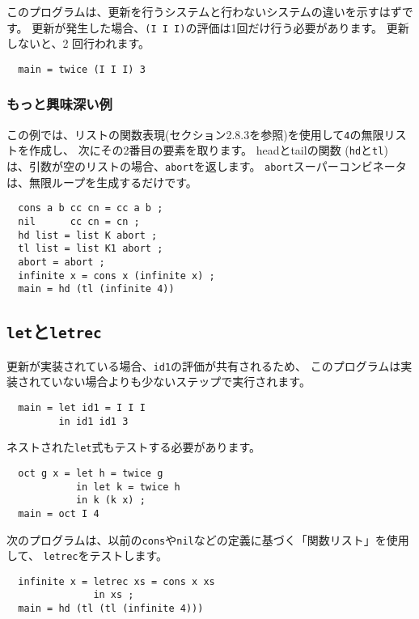 \documentclass{jarticle}
\begin{document}
このプログラムは、更新を行うシステムと行わないシステムの違いを示すはずです。
更新が発生した場合、\texttt{(I I I)}の評価は1回だけ行う必要があります。
更新しないと、2 回行われます。

\begin{verbatim}
  main = twice (I I I) 3
\end{verbatim}

\subsubsection{もっと興味深い例}

この例では、リストの関数表現(セクション2.8.3を参照)を使用して\texttt{4}の無限リストを作成し、
次にその2番目の要素を取ります。
headとtailの関数 (\texttt{hd}と\texttt{tl}) は、引数が空のリストの場合、\texttt{abort}を返します。
\texttt{abort}スーパーコンビネータは、無限ループを生成するだけです。

\begin{verbatim}
  cons a b cc cn = cc a b ;
  nil      cc cn = cn ;
  hd list = list K abort ;
  tl list = list K1 abort ;
  abort = abort ;
  infinite x = cons x (infinite x) ;
  main = hd (tl (infinite 4))
\end{verbatim}
\newpage

\subsection{\texttt{let}と\texttt{letrec}}

更新が実装されている場合、\texttt{id1}の評価が共有されるため、
このプログラムは実装されていない場合よりも少ないステップで実行されます。

\begin{verbatim}
  main = let id1 = I I I
         in id1 id1 3
\end{verbatim}

ネストされた\texttt{let}式もテストする必要があります。

\begin{verbatim}
  oct g x = let h = twice g
            in let k = twice h
            in k (k x) ;
  main = oct I 4
\end{verbatim}

次のプログラムは、以前の\texttt{cons}や\texttt{nil}などの定義に基づく「関数リスト」を使用して、
\texttt{letrec}をテストします。

\begin{verbatim}
  infinite x = letrec xs = cons x xs
               in xs ;
  main = hd (tl (tl (infinite 4)))
\end{verbatim}
\newpage
\end{document}
